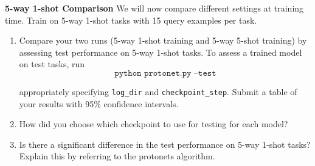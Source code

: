 \item {} {\bf 5-way 1-shot Comparison}
We will now compare different settings at training time. Train on 5-way 1-shot tasks with 15 query examples per task. 
\begin{enumerate}[label=(\roman*)]
    \item Compare your two runs (5-way 1-shot training and 5-way 5-shot training) by assessing test performance on 5-way 1-shot tasks. To assess a trained model on test tasks, run
    \begin{equation*}
        \texttt{python protonet.py --test}
    \end{equation*}

    appropriately specifying \texttt{log\_dir} and \texttt{checkpoint\_step}. Submit a table of your results with 95\% confidence intervals.
        
    \item How did you choose which checkpoint to use for testing for each model? 
        
    \item Is there a significant difference in the test performance on 5-way 1-shot tasks? Explain this by referring to the protonets algorithm.
\end{enumerate}